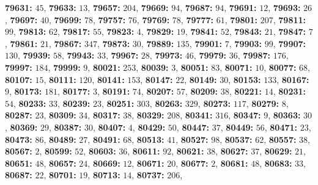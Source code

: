 \textsf{\bfseries 79631:} $45$, \textsf{\bfseries 79633:} $13$, \textsf{\bfseries 79657:} $204$, \textsf{\bfseries 79669:} $94$, \textsf{\bfseries 79687:} $94$, \textsf{\bfseries 79691:} $12$, \textsf{\bfseries 79693:} $26$, \textsf{\bfseries 79697:} $40$, \textsf{\bfseries 79699:} $78$, \textsf{\bfseries 79757:} $76$, \textsf{\bfseries 79769:} $78$, \textsf{\bfseries 79777:} $61$, \textsf{\bfseries 79801:} $207$, \textsf{\bfseries 79811:} $99$, \textsf{\bfseries 79813:} $62$, \textsf{\bfseries 79817:} $55$, \textsf{\bfseries 79823:} $4$, \textsf{\bfseries 79829:} $19$, \textsf{\bfseries 79841:} $52$, \textsf{\bfseries 79843:} $21$, \textsf{\bfseries 79847:} $7$, \textsf{\bfseries 79861:} $21$, \textsf{\bfseries 79867:} $347$, \textsf{\bfseries 79873:} $30$, \textsf{\bfseries 79889:} $135$, \textsf{\bfseries 79901:} $7$, \textsf{\bfseries 79903:} $99$, \textsf{\bfseries 79907:} $130$, \textsf{\bfseries 79939:} $58$, \textsf{\bfseries 79943:} $33$, \textsf{\bfseries 79967:} $28$, \textsf{\bfseries 79973:} $46$, \textsf{\bfseries 79979:} $36$, \textsf{\bfseries 79987:} $176$, \textsf{\bfseries 79997:} $184$, \textsf{\bfseries 79999:} $9$, \textsf{\bfseries 80021:} $253$, \textsf{\bfseries 80039:} $3$, \textsf{\bfseries 80051:} $83$, \textsf{\bfseries 80071:} $10$, \textsf{\bfseries 80077:} $68$, \textsf{\bfseries 80107:} $15$, \textsf{\bfseries 80111:} $120$, \textsf{\bfseries 80141:} $153$, \textsf{\bfseries 80147:} $22$, \textsf{\bfseries 80149:} $30$, \textsf{\bfseries 80153:} $133$, \textsf{\bfseries 80167:} $9$, \textsf{\bfseries 80173:} $181$, \textsf{\bfseries 80177:} $3$, \textsf{\bfseries 80191:} $74$, \textsf{\bfseries 80207:} $57$, \textsf{\bfseries 80209:} $38$, \textsf{\bfseries 80221:} $14$, \textsf{\bfseries 80231:} $54$, \textsf{\bfseries 80233:} $33$, \textsf{\bfseries 80239:} $23$, \textsf{\bfseries 80251:} $303$, \textsf{\bfseries 80263:} $329$, \textsf{\bfseries 80273:} $117$, \textsf{\bfseries 80279:} $8$, \textsf{\bfseries 80287:} $23$, \textsf{\bfseries 80309:} $34$, \textsf{\bfseries 80317:} $38$, \textsf{\bfseries 80329:} $208$, \textsf{\bfseries 80341:} $316$, \textsf{\bfseries 80347:} $9$, \textsf{\bfseries 80363:} $30$, \textsf{\bfseries 80369:} $29$, \textsf{\bfseries 80387:} $30$, \textsf{\bfseries 80407:} $4$, \textsf{\bfseries 80429:} $50$, \textsf{\bfseries 80447:} $37$, \textsf{\bfseries 80449:} $56$, \textsf{\bfseries 80471:} $23$, \textsf{\bfseries 80473:} $86$, \textsf{\bfseries 80489:} $27$, \textsf{\bfseries 80491:} $68$, \textsf{\bfseries 80513:} $41$, \textsf{\bfseries 80527:} $98$, \textsf{\bfseries 80537:} $62$, \textsf{\bfseries 80557:} $38$, \textsf{\bfseries 80567:} $2$, \textsf{\bfseries 80599:} $52$, \textsf{\bfseries 80603:} $36$, \textsf{\bfseries 80611:} $92$, \textsf{\bfseries 80621:} $38$, \textsf{\bfseries 80627:} $37$, \textsf{\bfseries 80629:} $21$, \textsf{\bfseries 80651:} $48$, \textsf{\bfseries 80657:} $24$, \textsf{\bfseries 80669:} $12$, \textsf{\bfseries 80671:} $20$, \textsf{\bfseries 80677:} $2$, \textsf{\bfseries 80681:} $48$, \textsf{\bfseries 80683:} $33$, \textsf{\bfseries 80687:} $22$, \textsf{\bfseries 80701:} $19$, \textsf{\bfseries 80713:} $14$, \textsf{\bfseries 80737:} $206$, 
